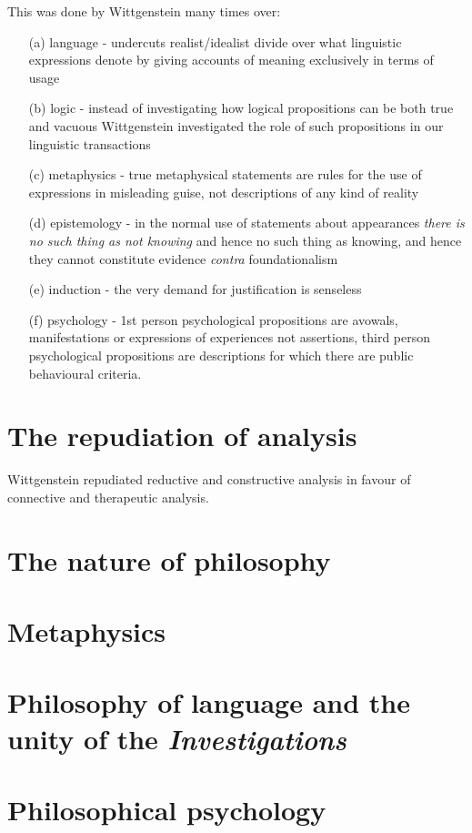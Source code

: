 \noindent
This was done by Wittgenstein many times over:
\begin{itemize}
\item[(a)] language - undercuts realist/idealist divide over what linguistic expressions denote by giving accounts of meaning exclusively in terms of usage
\item[(b)] logic - instead of investigating how logical propositions can be both true and vacuous Wittgenstein investigated the role of such propositions in our linguistic transactions
\item[(c)] metaphysics - true metaphysical statements are rules for the use of expressions in misleading guise, not descriptions of any kind of reality
\item[(d)] epistemology - in the normal use of statements about appearances {\it there is no such thing as not knowing} and hence no such thing as knowing, and hence they cannot constitute evidence {\it contra} foundationalism
\item[(e)] induction - the very demand for justification is senseless
\item[(f)] psychology - 1st person psychological propositions are avowals, manifestations or expressions of experiences not assertions, third person psychological propositions are descriptions for which there are public behavioural criteria. 

\end{itemize}


\section{The repudiation of analysis}

Wittgenstein repudiated reductive and constructive analysis in favour of connective and therapeutic analysis.

\section{The nature of philosophy}

\section{Metaphysics}

\section{Philosophy of language and the unity of the {\it Investigations}}

\section{Philosophical psychology}
